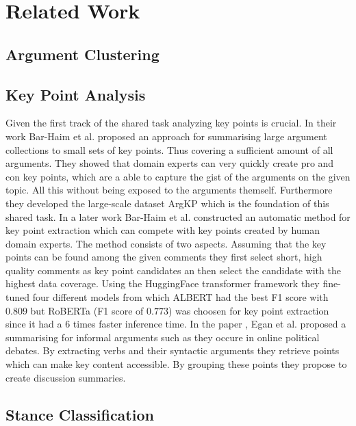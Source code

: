 \section{Related Work} 

    \subsection{Argument Clustering}

    \subsection{Key Point Analysis}
        Given the first track of the shared task analyzing key points is crucial. In their work \cite{Bar-HaimEFKLS2020} 
        Bar-Haim et al. proposed an approach for summarising large argument collections to small sets of key points. Thus
        covering a sufficient amount of all arguments. They showed that domain experts can very quickly
        create pro and con key points, which are a able to capture the gist of the arguments on the given topic. All this
        without being exposed to the arguments themself. Furthermore they developed the large-scale dataset ArgKP
        which is the foundation of this shared task. 
        In a later work \cite{Bar-HaimKEFLS2020} Bar-Haim et al. constructed an automatic method for key point 
        extraction which can compete with key points created by human domain experts. The method consists of two aspects. 
        Assuming that the key points can be found among the given comments 
        they first select short, high quality comments as key point candidates an then select the candidate with the highest
        data coverage. Using the HuggingFace transformer framework they fine-tuned four different models from which 
        ALBERT \cite{lan2019albert} had the best F1 score with $0.809$ but RoBERTa \cite{liu2019roberta} (F1 score of 
        $0.773$) was choosen for key point extraction since it had a 6 times faster inference time. 
        In the paper \cite{egan2016summarising}, Egan et al. proposed a summarising for informal arguments such as they
        occure in online political debates. By extracting verbs and their syntactic arguments they retrieve points which
        can make key content accessible. By grouping these points they propose to create discussion summaries.

    \subsection{Stance Classification}
